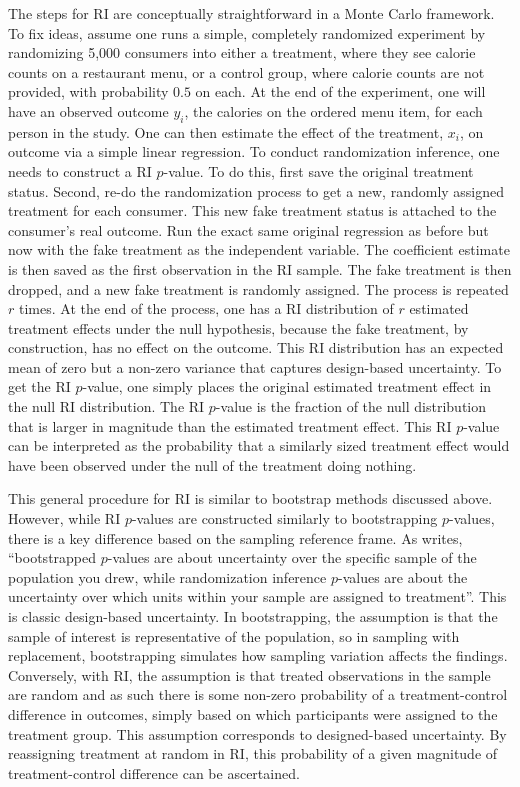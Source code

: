 \documentclass[11pt]{article}
\begin{document}
The steps for RI are conceptually straightforward in a Monte Carlo framework. To fix ideas, assume one runs a simple, completely randomized experiment by randomizing 5,000 consumers into either a treatment, where they see calorie counts on a restaurant menu, or a control group, where calorie counts are not provided, with probability $0.5$ on each. At the end of the experiment, one will have an observed outcome $y_i$, the calories on the ordered menu item, for each person in the study. One can then estimate the effect of the treatment, $x_i$, on outcome via a simple linear regression. To conduct randomization inference, one needs to construct a RI $p$-value. To do this, first save the original treatment status. Second, re-do the randomization process to get a new, randomly assigned treatment for each consumer. This new fake treatment status is attached to the consumer’s real outcome. Run the exact same original regression as before but now with the fake treatment as the independent variable. The coefficient estimate is then saved as the first observation in the RI sample. The fake treatment is then dropped, and a new fake treatment is randomly assigned. The process is repeated $r$ times. At the end of the process, one has a RI distribution of $r$ estimated treatment effects under the null hypothesis, because the fake treatment, by construction, has no effect on the outcome. This RI distribution has an expected mean of zero but a non-zero variance that captures design-based uncertainty. To get the RI $p$-value, one simply places the original estimated treatment effect in the null RI distribution. The RI $p$-value is the fraction of the null distribution that is larger in magnitude than the estimated treatment effect. This RI $p$-value can be interpreted as the probability that a similarly sized treatment effect would have been observed under the null of the treatment doing nothing.

This general procedure for RI is similar to bootstrap methods discussed above. However, while RI $p$-values are constructed similarly to bootstrapping $p$-values, there is a key difference based on the sampling reference frame. As \cite{kerwin_randomization_2017} writes, ``bootstrapped $p$-values are about uncertainty over the specific sample of the population you drew, while randomization inference $p$-values are about the uncertainty over which units within your sample are assigned to treatment''. This is classic design-based uncertainty. In bootstrapping, the assumption is that the sample of interest is representative of the population, so in sampling with replacement, bootstrapping simulates how sampling variation affects the findings. Conversely, with RI, the assumption is that treated observations in the sample are random and as such there is some non-zero probability of a treatment-control difference in outcomes, simply based on which participants were assigned to the treatment group. This assumption corresponds to designed-based uncertainty. By reassigning treatment at random in RI, this probability of a given magnitude of treatment-control difference can be ascertained. 
\end{document}
